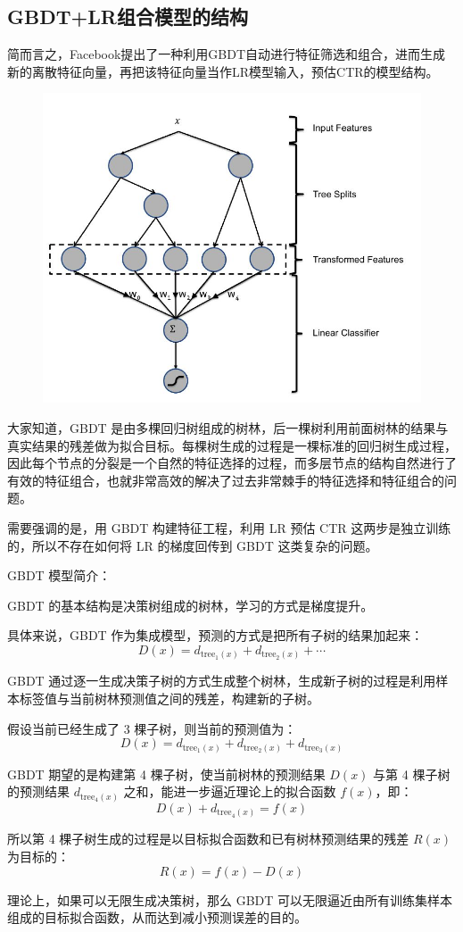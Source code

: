 \documentclass[12pt]{article}
\begin{document}
\subsection{GBDT+LR组合模型的结构}
简而言之，Facebook提出了一种利用GBDT自动进行特征筛选和组合，进而生成新的离散特征向量，再把该特征向量当作LR模型输入，预估CTR的模型结构。

\begin{figure}[H]
    \centering
    \includegraphics[width=.6\textwidth]{fig/Facebook_GBDT_LR_Feature.jpg}
\end{figure}

大家知道，GBDT 是由多棵回归树组成的树林，后一棵树利用前面树林的结果与真实结果的残差做为拟合目标。每棵树生成的过程是一棵标准的回归树生成过程，因此每个节点的分裂是一个自然的特征选择的过程，而多层节点的结构自然进行了有效的特征组合，也就非常高效的解决了过去非常棘手的特征选择和特征组合的问题。

需要强调的是，用 GBDT 构建特征工程，利用 LR 预估 CTR 这两步是独立训练的，所以不存在如何将 LR 的梯度回传到 GBDT 这类复杂的问题。

\begin{framed}
GBDT 模型简介：

GBDT 的基本结构是决策树组成的树林，学习的方式是梯度提升。

具体来说，GBDT 作为集成模型，预测的方式是把所有子树的结果加起来：
$$
D(x) = d_{\text{tree}_1(x)} + d_{\text{tree}_2(x)} + \cdots
$$

GBDT 通过逐一生成决策子树的方式生成整个树林，生成新子树的过程是利用样本标签值与当前树林预测值之间的残差，构建新的子树。

假设当前已经生成了 3 棵子树，则当前的预测值为：
$$
D(x) = d_{\text{tree}_1(x)} + d_{\text{tree}_2(x)} + d_{\text{tree}_3(x)}
$$

GBDT 期望的是构建第 4 棵子树，使当前树林的预测结果 $D(x)$ 与第 4 棵子树的预测结果 $d_{\text{tree}_4(x)}$ 之和，能进一步逼近理论上的拟合函数 $f(x)$，即：
$$
D(x) + d_{\text{tree}_4(x)} = f(x)
$$

所以第 4 棵子树生成的过程是以目标拟合函数和已有树林预测结果的残差 $R(x)$ 为目标的：
$$
R(x) = f(x) - D(x)
$$

理论上，如果可以无限生成决策树，那么 GBDT 可以无限逼近由所有训练集样本组成的目标拟合函数，从而达到减小预测误差的目的。
\end{framed}
\end{document}
